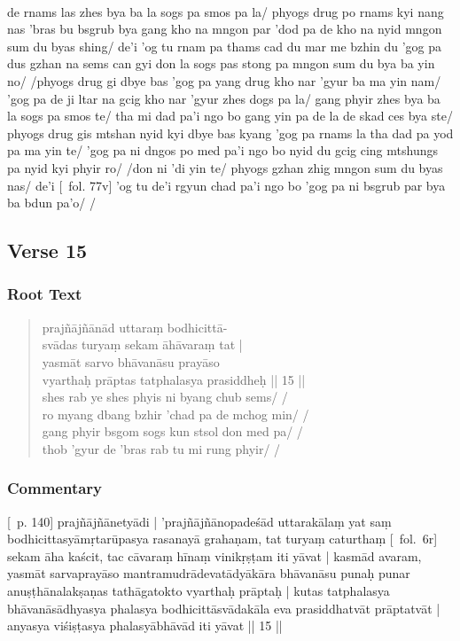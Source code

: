 \documentclass[12pt]{article}
\begin{document}
\textbf{\TVB}\\
de rnams las zhes bya ba la sogs pa smos pa la/ phyogs drug po rnams kyi nang nas 'bras bu bsgrub bya gang kho na mngon par 'dod pa de kho na nyid mngon sum du byas shing/ de'i 'og tu rnam pa thams cad du mar me bzhin du 'gog pa dus gzhan na sems can gyi don la sogs pas stong pa mngon sum du bya ba yin no/ /phyogs drug gi dbye bas 'gog pa yang drug kho nar 'gyur ba ma yin nam/ 'gog pa de ji ltar na gcig kho nar 'gyur zhes dogs pa la/ gang phyir zhes bya ba la sogs pa smos te/ tha mi dad pa'i ngo bo gang yin pa de la de skad ces bya ste/ phyogs drug gis mtshan nyid kyi dbye bas kyang 'gog pa rnams la tha dad pa yod pa ma yin te/ 'gog pa ni dngos po med pa'i ngo bo nyid du gcig cing mtshungs pa nyid kyi phyir ro/ /don ni 'di yin te/ phyogs gzhan zhig mngon sum du byas nas/ de'i [\TVB\ fol. 77v] 'og tu de'i rgyun chad pa'i ngo bo 'gog pa ni bsgrub par bya ba bdun pa'o/ /

\subsection{Verse 15}
\subsubsection{Root Text}
\begin{quote}
	prajñājñānād uttaraṃ bodhicittā-\\
	svādas turyaṃ sekam\footnoteB{
		sekam] \EDD ; seṣam \MS
	} āhāvaraṃ tat |\\
	yasmāt\footnoteB{
		yasmāt] \EDD ; paścāt \MS
	} sarvo bhāvanāsu prayāso \\
	vyarthaḥ prāptas tatphalasya prasiddheḥ || 15 ||\\

	shes rab ye shes phyis ni byang chub sems/ /\\
	ro myang dbang bzhir 'chad pa de mchog min/ /\\
	gang phyir bsgom sogs kun stsol don med pa/ /\\
	thob 'gyur de 'bras rab tu mi rung phyir/ /
\end{quote}

\subsubsection{Commentary}
[\EDD\ p. 140] prajñājñānetyādi | 'prajñājñānopadeśād uttarakālaṃ yat saṃ bodhicittasyāmṛtarūpasya rasanayā grahaṇam, tat turyaṃ caturthaṃ [\MS\ fol.\ 6r] sekam āha kaścit, tac cāvaraṃ hīnaṃ vinikṛṣṭam iti yāvat | kasmād avaram, yasmāt sarvaprayāso mantramudrādevatādyākāra bhāvanāsu punaḥ punar anuṣṭhānalakṣaṇas tathāgatokto vyarthaḥ prāptaḥ | kutas tatphalasya bhāvanāsādhyasya phalasya bodhicittāsvādakāla eva prasiddhatvāt prāptatvāt | anyasya viśiṣṭasya phalasyābhāvād iti yāvat || 15 ||\\
\end{document}
